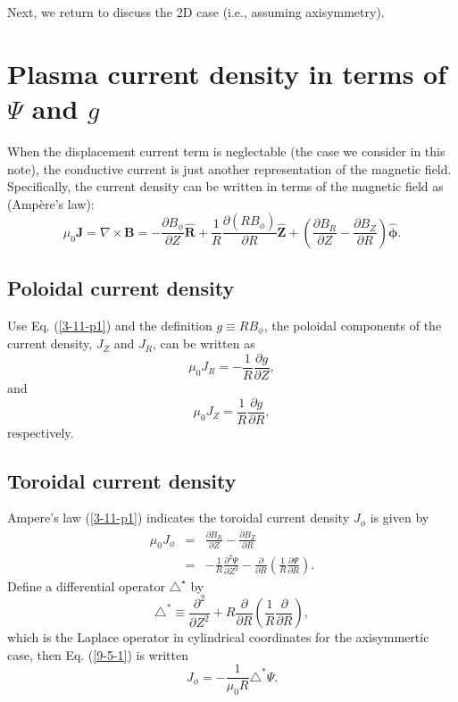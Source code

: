 \documentclass{llncs}
\newcommand{\tmmathbf}[1]{\ensuremath{\boldsymbol{#1}}}
\begin{document}
Next, we return to discuss the 2D case (i.e., assuming axisymmetry).

\section{Plasma current density in terms of $\Psi$ and $g$}

When the displacement current term is neglectable (the case we consider in
this note), the conductive current is just another representation of the
magnetic field. Specifically, the current density can be written in terms of
the magnetic field as (Amp{\`e}re's law):
\begin{equation}
  \label{3-11-p1} \mu_0 \mathbf{J}= \nabla \times \mathbf{B}= - \frac{\partial
  B_{\phi}}{\partial Z} \hat{\mathbf{R}} + \frac{1}{R} \frac{\partial (R
  B_{\phi})}{\partial R} \hat{\mathbf{Z}} + \left( \frac{\partial
  B_R}{\partial Z} - \frac{\partial B_Z}{\partial R} \right)
  \hat{\tmmathbf{\phi}} .
\end{equation}

\subsection{Poloidal current density}

Use Eq. (\ref{3-11-p1}) and the definition $g \equiv R B_{\phi}$, the poloidal
components of the current density, $J_Z$ and $J_R$, can be written as
\begin{equation}
  \label{5-2-a2} \mu_0 J_R = - \frac{1}{R} \frac{\partial g}{\partial Z},
\end{equation}
and
\begin{equation}
  \label{5-2-a1} \mu_0 J_Z = \frac{1}{R} \frac{\partial g}{\partial R},
\end{equation}
respectively.

\subsection{Toroidal current density}

Ampere's law (\ref{3-11-p1}) indicates the toroidal current density $J_{\phi}$
is given by
\begin{eqnarray}
  \mu_0 J_{\phi} & = & \frac{\partial B_R}{\partial Z} - \frac{\partial
  B_Z}{\partial R} \nonumber\\
  & = & - \frac{1}{R} \frac{\partial^2 \Psi}{\partial Z^2} -
  \frac{\partial}{\partial R} \left( \frac{1}{R} \frac{\partial \Psi}{\partial
  R} \right) .  \label{9-5-1}
\end{eqnarray}
Define a differential operator $\triangle^{\star}$ by
\begin{equation}
  \triangle^{\ast} \equiv \frac{\partial^2}{\partial Z^2} + R
  \frac{\partial}{\partial R} \left( \frac{1}{R} \frac{\partial}{\partial R}
  \right),
\end{equation}
which is the Laplace operator in cylindrical coordinates for the axisymmertic
case, then Eq. (\ref{9-5-1}) is written
\begin{equation}
  \label{6-9-a1} J_{\phi} = - \frac{1}{\mu_0 R} \triangle^{\ast} \Psi .
\end{equation}
\end{document}
